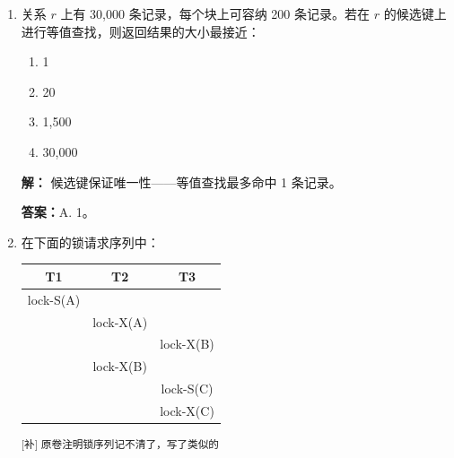 \documentclass[11pt,a4paper]{article}
\newcommand{\solution}{\par\noindent\textcolor{ansblue}{\textbf{解：}}}
\newcommand{\answer}{\par\noindent\textcolor{ansred}{\textbf{答案：}}}
\newcommand{\supp}[1]{\textcolor{ansred}{\textsuperscript{[补] #1}}}
\begin{document}
\begin{enumerate}[leftmargin=*,itemsep=8pt]
\solution
$b_r = 50,000/200 = 250$ 块，$b_s = 20,000/50 = 400$ 块。

Hash join（不分块）：
\begin{itemize}[nosep]
  \item 分区 $r$（读+写）：$2 \times 250 = 500$ transfer
  \item 分区 $s$（读+写）：$2 \times 400 = 800$ transfer
  \item Join 阶段（读分区结果）：$250 + 400 = 650$ transfer
  \item 总 transfer：$500 + 800 + 650 = \mathbf{1950}$
\end{itemize}

Seek 次数取决于缓冲区大小。若每块一个 seek（最坏）：
$(250+400) \times 2 = 1300$ seek（写分区时每 block 一次 seek）。
加少量 join 阶段 seek $\approx$ 1350。

\answer C. 1950 transfer + 1350 seek。\supp{若假设较大的缓冲区则 seek 可降至 650 左右，选 B。实际考场需根据平时习题的缓冲区假设判断。}

\item 关系 $r$ 上有 30,000 条记录，每个块上可容纳 200 条记录。若在 $r$ 的候选键上进行等值查找，则返回结果的大小最接近：

\begin{enumerate}[label=\Alph*.]
  \item 1
  \item 20
  \item 1,500
  \item 30,000
\end{enumerate}

\solution
候选键保证唯一性——等值查找最多命中 1 条记录。

\answer A. 1。

\item 在下面的锁请求序列中：

\begin{center}
\begin{tabular}{c|c|c}
T1 & T2 & T3 \\
\midrule
lock-S(A) & & \\
& lock-X(A) & \\
& & lock-X(B) \\
& lock-X(B) & \\
& & lock-S(C) \\
& & lock-X(C) \\
\end{tabular}
\end{center}

\supp{原卷注明锁序列记不清了，写了类似的}


\end{enumerate}
\end{document}
